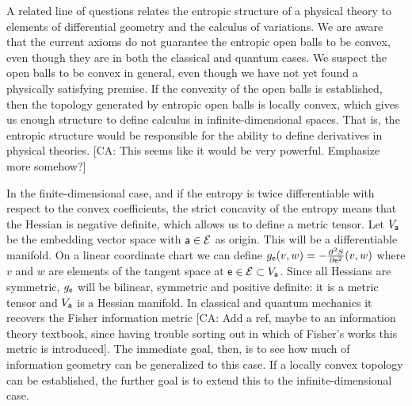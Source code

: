 A related line of questions relates the entropic structure of a physical theory to elements of differential geometry and the calculus of variations. We are aware that the current axioms do not guarantee the entropic open balls to be convex, even though they are in both the classical and quantum cases. We suspect the open balls to be convex in general, even though we have not yet found a physically satisfying premise. If the convexity of the open balls is established, then the topology generated by entropic open balls is locally convex, which gives us enough structure to define calculus in infinite-dimensional spaces. That is, the entropic structure would be responsible for the ability to define derivatives in physical theories. [CA: This seems like it would be very powerful. Emphasize more somehow?]

In the finite-dimensional case, and if the entropy is twice differentiable with respect to the convex coefficients, the strict concavity of the entropy means that the Hessian is negative definite, which allows us to define a metric tensor. Let $V_{\ens[a]}$ be the embedding vector space with $\ens[a] \in \Ens$ as origin. This will be a differentiable manifold. On a linear coordinate chart we can define $g_{\ens}( v, w ) = - \frac{\partial^2 S}{\partial \ens ^2}( v, w )$ where $v$ and $w$ are elements of the tangent space at $\ens \in \Ens \subset V_{\ens[a]}$. Since all Hessians are symmetric, $g_{\ens}$ will be bilinear, symmetric and positive definite: it is a metric tensor and $V_{\ens[a]}$ is a Hessian manifold. In classical and quantum mechanics it recovers the Fisher information metric [CA: Add a ref, maybe to an information theory textbook, since having trouble sorting out in which of Fisher's works this metric is introduced]. The immediate goal, then, is to see how much of information geometry can be generalized to this case. If a locally convex topology can be established, the further goal is to extend this to the infinite-dimensional case.

